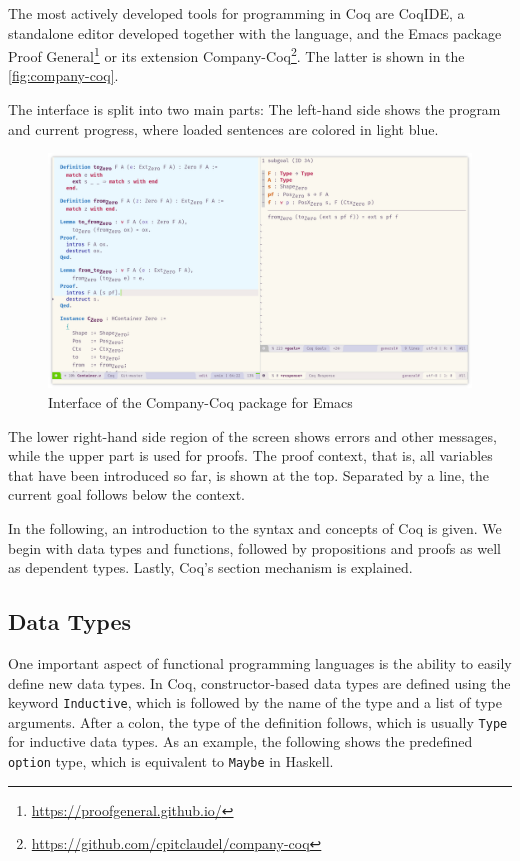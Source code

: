 \documentclass[a4paper, 11pt, fleqn, twoside, abstract=on]{scrreprt}
\newcommand{\hinl}[1]{\texttt{#1}}
\newcommand{\cinl}[1]{\texttt{#1}}
\begin{document}
The most actively developed tools for programming in Coq are CoqIDE, a standalone editor developed together with the language, and the Emacs package Proof General\footnote{\url{https://proofgeneral.github.io/}} or its extension Company-Coq\footnote{\url{https://github.com/cpitclaudel/company-coq}}.
The latter is shown in the \autoref{fig:company-coq}.

The interface is split into two main parts: The left-hand side shows the program and current progress, where loaded sentences are colored in light blue.
\begin{figure}
\begin{center}
\includegraphics[width=\textwidth]{img/coq.png}
\end{center}
\caption{Interface of the Company-Coq package for Emacs}
\label{fig:company-coq}
\end{figure}
\noindent
The lower right-hand side region of the screen shows errors and other messages, while the upper part is used for proofs.
The proof context, that is, all variables that have been introduced so far, is shown at the top.
Separated by a line, the current goal follows below the context.

In the following, an introduction to the syntax and concepts of Coq is given.
We begin with data types and functions, followed by propositions and proofs as well as dependent types.
Lastly, Coq's section mechanism is explained.

\subsection{Data Types}
\label{subsec:coqdatatypes}
One important aspect of functional programming languages is the ability to easily define new data types.
In Coq, constructor-based data types are defined using the keyword \cinl{Inductive}, which is followed by the name of the type and a list of type arguments.
After a colon, the type of the definition follows, which is usually \cinl{Type} for inductive data types.
As an example, the following shows the predefined \cinl{option} type, which is equivalent to \hinl{Maybe} in Haskell.
\end{document}

